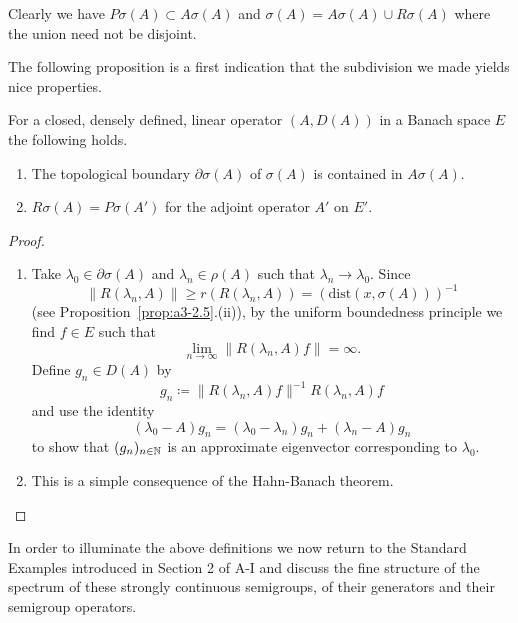 Clearly we have $P\sigma(A) \subset A\sigma(A)$ and $\sigma(A) = A\sigma(A) \cup R\sigma(A)$ where the union need not be disjoint.

The following proposition is a first indication that the subdivision we made yields nice properties.
\begin{proposition}\label{prop:a3-2.2}
For a closed, densely defined, linear operator $(A,D(A))$ in a Banach space $E$ the following holds.
\begin{enumerate}[\upshape (i)]

\item
The topological boundary $\partial\sigma(A)$ of $\sigma(A)$ is contained in $A\sigma(A)$.

\item
$R\sigma(A) = P\sigma(A')$ for the adjoint operator $A'$ on $E'$.

\end{enumerate}
\end{proposition}
\begin{proof}
\begin{enumerate}[\upshape (i), wide, labelindent=.5em]

\item 
Take $\lambda_{0} \in \partial\sigma(A)$ and $\lambda_{n} \in \rho(A)$ such that $\lambda_{n} \to \lambda_{0}$.
Since 
%
\[
	 \|R(\lambda_{n},A)\| \geq r(R(\lambda_{n},A)) = (\text{dist}(x,\sigma(A)))^{-1} 
\]
%
(see Proposition~\ref{prop:a3-2.5}.(ii)), by the uniform boundedness principle we find $f \in E$ such that
\[
	\lim_{n \to \infty}\|R(\lambda_n ,A)f\| = \infty .
\]
Define $g_{n} \in D(A)$ by
\[
g_{n} \coloneqq \|R(\lambda_{n},A)f\|^{-1} R(\lambda_{n},A)f
\]
and use the identity
\[
	(\lambda_{0} - A)g_{n} = (\lambda_{0} - \lambda_{n})g_{n} + (\lambda_{n} - A)g_{n}
\]
to show that $(g_{n})_{n \in \mathbb{N}}$ is an approximate eigenvector corresponding to $\lambda_{0}$.

\item 
This is a simple consequence of the Hahn-Banach theorem.
\end{enumerate}
\end{proof}
In order to illuminate the above definitions we now return to the Standard Examples introduced in Section 2 of A-I and discuss the fine structure of the spectrum of these strongly continuous semigroups, \ie of their generators and their semigroup operators.
